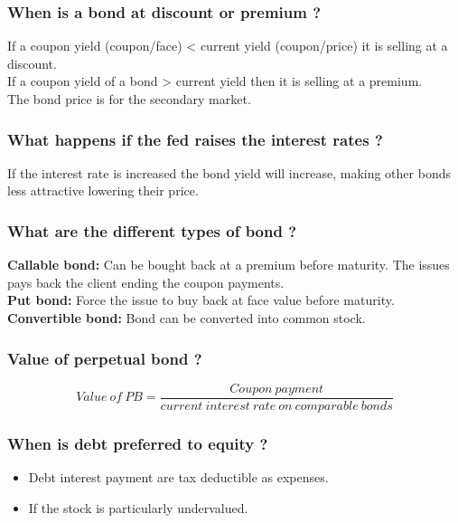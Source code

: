 \documentclass[11pt]{scrartcl} %
\begin{document}
\subsubsection{When is a bond at discount or premium ?}

If a coupon yield (coupon/face) < current yield (coupon/price) it is selling at a discount.\\
If a coupon yield of a bond > current yield then it is selling at a premium.\\

The bond price is for the secondary market.

\subsubsection{What happens if the fed raises the interest rates ?}

If the interest rate is increased the bond yield will increase, making other bonds less attractive lowering their price.

\subsubsection{What are the different types of bond ?}

\textbf{Callable bond:} Can be bought back at a premium before maturity. The issues pays back the client ending the coupon payments.\\
\textbf{Put bond:} Force the issue to buy back at face value before maturity.\\
\textbf{Convertible bond:} Bond can be converted into common stock.\\

\subsubsection{Value of perpetual bond ?}

\[ Value\:of\:PB = \frac{Coupon\:payment}{current\:interest\:rate\:on\:comparable\:bonds} \]

\subsubsection{When is debt preferred to equity ?}

\begin{itemize}
	\item Debt interest payment are tax deductible as expenses.
	\item If the stock is particularly undervalued.
\end{itemize}
\end{document}
